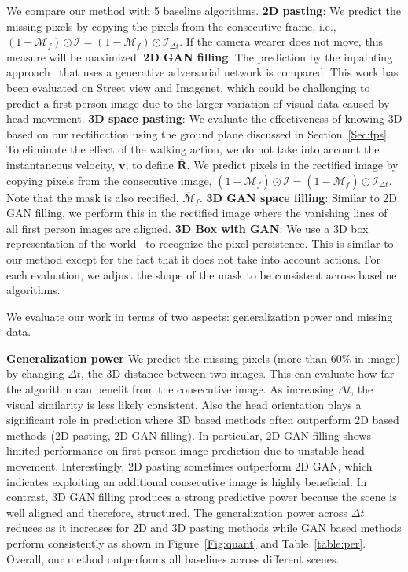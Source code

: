 \documentclass[10pt,twocolumn,letterpaper]{article}
\begin{document}
We compare our method with 5 baseline algorithms. \textbf{2D pasting}: We predict the missing pixels by copying the pixels from the consecutive frame, i.e., $(1-\mathcal{M}_f) \odot \mathcal{I} = (1-\mathcal{M}_f) \odot \mathcal{I}_{\Delta t}$. If the camera wearer does not move, this measure will be maximized. \textbf{2D GAN filling}: The prediction by the inpainting approach~\cite{pathakCVPR16context} that uses a generative adversarial network is compared. This work has been evaluated on Street view and Imagenet, which could be challenging to predict a first person image due to the larger variation of visual data caused by head movement. \textbf{3D space pasting}: We evaluate the effectiveness of knowing 3D based on our rectification using the ground plane discussed in Section~\ref{Sec:fps}. To eliminate the effect of the walking action, we do not take into account the instantaneous velocity, $\mathbf{v}$, to define $\overline{\mathbf{R}}$. We predict pixels in the rectified image by copying pixels from the consecutive image, $(1-\overline{\mathcal{M}}_f) \odot \overline{\mathcal{I}} = (1-\overline{\mathcal{M}}_f) \odot \overline{\mathcal{I}}_{\Delta t}$. Note that the mask is also rectified, $\overline{\mathcal{M}}_f$. \textbf{3D GAN space filling}: Similar to 2D GAN filling, we perform this in the rectified image where the vanishing lines of all first person images are aligned. \textbf{3D Box with GAN}: We use a 3D box representation of the world~\cite{Horry:1997} to recognize the pixel persistence. This is similar to our method except for the fact that it does not take into account actions. For each evaluation, we adjust the shape of the mask to be consistent across baseline algorithms. 

We evaluate our work in terms of two aspects: generalization power and missing data.

\noindent\textbf{Generalization power} We predict the missing pixels (more than 60\% in image) by changing $\Delta t$, the 3D distance between two images. This can evaluate how far the algorithm can benefit from the consecutive image. As increasing $\Delta t$, the visual similarity is less likely consistent. Also the head orientation plays a significant role in prediction where 3D based methods often outperform 2D based methods (2D pasting, 2D GAN filling). In particular, 2D GAN filling shows limited performance on first person image prediction due to unstable head movement. Interestingly, 2D pasting sometimes outperform 2D GAN, which indicates exploiting an additional consecutive image is highly beneficial. In contrast, 3D GAN filling produces a strong predictive power because the scene is well aligned and therefore, structured. The generalization power across $\Delta t$ reduces as it increases for 2D and 3D pasting methods while GAN based methods perform consistently as shown in Figure~\ref{Fig:quant} and Table~\ref{table:per}. Overall, our method outperforms all baselines across different scenes. 
\end{document}
